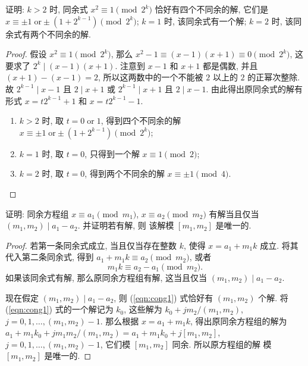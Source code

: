 \documentclass[a5paper,fleqn,10pt]{article}
\begin{document}
\begin{exmp}
	证明: $k>2$ 时, 同余式 $x^2\equiv 1\pmod{2^k}$ 恰好有四个不同余的解, 它们是 $x\equiv\pm 1\;\text{or}\pm\!(1+2^{k-1})\pmod{2^k}$;
	$k=1$ 时, 该同余式有一个解; $k=2$ 时, 该同余式有两个不同余的解.
\end{exmp}
\begin{proof}
	假设 $x^2\equiv 1\pmod{2^k}$, 那么 $x^2-1\equiv(x-1)(x+1)\equiv 0\pmod{2^k}$, 这要求了 $2^k\mid(x-1)(x+1)$.
	注意到 $x-1$ 和 $x+1$ 都是偶数, 并且 $(x+1)-(x-1)=2$, 所以这两数中的一个不能被 $2$ 以上的 $2$ 的正幂次整除. 故
	$2^{k-1}\mid x-1$ 且 $2\mid x+1$ 或 $2^{k-1}\mid x+1$ 且 $2\mid x-1$. 由此得出原同余式的解有形式 $x=t2^{k-1}+1$
	和 $x=t2^{k-1}-1$.
	\begin{enumerate}
		\item $k>2$ 时, 取 $t=0\;\text{or}\;1$, 得到四个不同余的解 $x\equiv\pm 1\;\text{or}\pm\!(1+2^{k-1})\pmod{2^k}$;
		\item $k=1$ 时, 取 $t=0$, 只得到一个解 $x\equiv 1\pmod 2$;
		\item $k=2$ 时, 取 $t=0$, 得到两个不同余的解 $x\equiv\pm 1\pmod{4}$.\qedhere
	\end{enumerate}
\end{proof}

\begin{exmp}\label{exmp:unique_solution1}
	证明: 同余方程组 $x\equiv a_1\pmod{m_1}$, $x\equiv a_2\pmod{m_2}$ 有解当且仅当 $(m_1,m_2)\mid a_1-a_2$. 并证明若有解, 则
	该解模 $[m_1,m_2]$ 是唯一的.
\end{exmp}
\begin{proof}
	若第一条同余式成立, 当且仅当存在整数 $k$, 使得 $x=a_1+m_1k$ 成立. 将其代入第二条同余式, 得到 $a_1+m_1k\equiv a_2\pmod{m_2}$, 或者
	\begin{equation}\label{eqn:cong1}
		m_1k\equiv a_2-a_1\pmod{m_2}.
	\end{equation}
	如果该同余式有解, 那么原同余方程组有解, 这当且仅当 $(m_1,m_2)\mid a_1-a_2$.

	现在假定 $(m_1,m_2)\mid a_1-a_2$, 则 (\ref{eqn:cong1}) 式恰好有 $(m_1,m_2)$ 个解. 将 (\ref{eqn:cong1}) 式的一个解记为 $k_0$, 这些解为
	$k_0+jm_2/(m_1,m_2)$, $j=0,1,\ldots,(m_1,m_2)-1$. 那么根据 $x=a_1+m_1k$, 得出原同余方程组的解为
	$a_1+m_1k_0+jm_1m_2/(m_1,m_2)=a_1+m_1k_0+j[m_1,m_2]$, $j=0,1,\ldots,(m_1,m_2)-1$, 它们模 $[m_1,m_2]$ 同余. 所以原方程组的解
	模 $[m_1,m_2]$ 是唯一的.
\end{proof}
\end{document}
